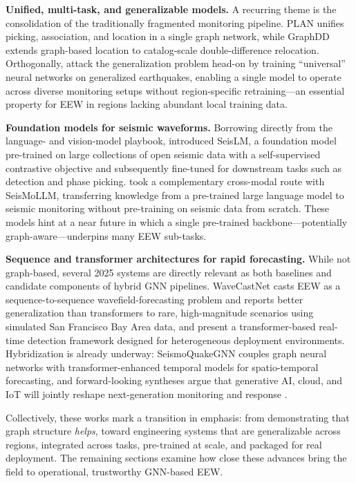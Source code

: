 \documentclass[review,authoryear]{elsarticle}
\begin{document}
\textbf{Unified, multi-task, and generalizable models.} A recurring theme is the consolidation of the traditionally fragmented monitoring pipeline. PLAN \citep{si2024plan} unifies picking, association, and location in a single graph network, while GraphDD \citep{mcbrearty2025graphdd} extends graph-based location to catalog-scale double-difference relocation. Orthogonally, \citet{zhang2024universal} attack the generalization problem head-on by training ``universal'' neural networks on generalized earthquakes, enabling a single model to operate across diverse monitoring setups without region-specific retraining---an essential property for EEW in regions lacking abundant local training data.

\textbf{Foundation models for seismic waveforms.} Borrowing directly from the language- and vision-model playbook, \citet{liu2024seislm} introduced SeisLM, a foundation model pre-trained on large collections of open seismic data with a self-supervised contrastive objective and subsequently fine-tuned for downstream tasks such as detection and phase picking. \citet{wang2025seismollm} took a complementary cross-modal route with SeisMoLLM, transferring knowledge from a pre-trained large language model to seismic monitoring without pre-training on seismic data from scratch. These models hint at a near future in which a single pre-trained backbone---potentially graph-aware---underpins many EEW sub-tasks.

\textbf{Sequence and transformer architectures for rapid forecasting.} While not graph-based, several 2025 systems are directly relevant as both baselines and candidate components of hybrid GNN pipelines. WaveCastNet \citep{lyu2025wavecastnet} casts EEW as a sequence-to-sequence wavefield-forecasting problem and reports better generalization than transformers to rare, high-magnitude scenarios using simulated San Francisco Bay Area data, and \citet{wu2025transformer} present a transformer-based real-time detection framework designed for heterogeneous deployment environments. Hybridization is already underway: SeismoQuakeGNN \citep{leema2025seismoquakegnn} couples graph neural networks with transformer-enhanced temporal models for spatio-temporal forecasting, and forward-looking syntheses argue that generative AI, cloud, and IoT will jointly reshape next-generation monitoring and response \citep{dhir2026nextgen}.

Collectively, these works mark a transition in emphasis: from demonstrating that graph structure \emph{helps}, toward engineering systems that are generalizable across regions, integrated across tasks, pre-trained at scale, and packaged for real deployment. The remaining sections examine how close these advances bring the field to operational, trustworthy GNN-based EEW.
\end{document}
